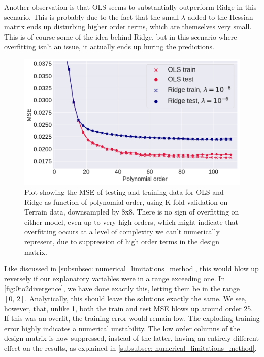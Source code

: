 \documentclass[10pt, twocolumn]{article}
\begin{document}
Another observation is that OLS seems to substantially outperform Ridge in this scenario. This is probably due to the fact that the small $\lambda$ added to the Hessian matrix ends up disturbing higher order terms, which are themselves very small. This is of course some of the idea behind Ridge, but in this scenario where overfitting isn't an issue, it actually ends up huring the predictions.



\begin{figure}[h!]
    \centering
    \includegraphics[scale=0.4]{../figs/OLS_Ridge_8sample_poly110.pdf}
    \caption{Plot showing the MSE of testing and training data for OLS and Ridge as function of polynomial order, using K fold validation on Terrain data, downsampled by 8x8. There is no sign of overfitting on either model, even up to very high orders, which might indicate that overfitting occurs at a level of complexity we can't numerically represent, due to suppression of high order terms in the design matrix.}
    \label{fig:Terrain_8x8_poly100}
\end{figure}



Like discussed in \cref{subsubsec: numerical_limitations_method}, this would blow up reversely if our explanatory variables were in a range exceeding one. In \cref{fig:0to2divergence}, we have done exactly this, letting them be in the range $[0,\, 2]$. Analytically, this should leave the solutions exactly the same. We see, however, that, unlike \cref{fig:Terrain_8x8_poly100}, both the train and test MSE blows up around order 25. If this was an overfit, the training error would remain low. The exploding training error highly indicates a numerical unstability. The low order columns of the design matrix is now suppressed, instead of the latter, having an entirely different effect on the results, as explained in \cref{subsubsec: numerical_limitations_method}.
\end{document}
